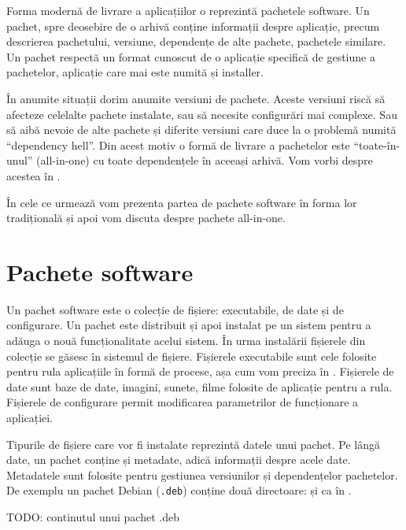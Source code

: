 Forma modernă de livrare a aplicațiilor o reprezintă pachetele software. Un pachet, spre deosebire de o arhivă conține informații despre aplicație, precum descrierea pachetului, versiune, dependențe de alte pachete, pachetele similare. Un pachet respectă un format cunoscut de o aplicație specifică de gestiune a pachetelor, aplicație care mai este numită și installer.

În anumite situații dorim anumite versiuni de pachete. Aceste versiuni riscă să afecteze celelalte pachete instalate, sau să necesite configurări mai complexe. Sau să aibă nevoie de alte pachete și diferite versiuni care duce la o problemă numită “dependency hell”. Din acest motiv o formă de livrare a pachetelor este “toate-în-unul” (all-in-one) cu toate dependențele în aceeași arhivă. Vom vorbi despre acestea în .

În cele ce urmează vom prezenta partea de pachete software în forma lor tradițională și apoi vom discuta despre pachete all-in-one.

\section{Pachete software}
\label{sec:package:overview}

Un pachet software este o colecție de fișiere: executabile, de date și de configurare. Un pachet este distribuit și apoi instalat pe un sistem pentru a adăuga o nouă funcționalitate acelui sistem. În urma instalării fișierele din colecție se găsesc în sistemul de fișiere. Fișierele executabile sunt cele folosite pentru rula aplicațiile în formă de procese, așa cum vom preciza în . Fișierele de date sunt baze de date, imagini, sunete, filme folosite de aplicație pentru a rula. Fișierele de configurare permit modificarea parametrilor de funcționare a aplicației.

Tipurile de fișiere care vor fi instalate reprezintă datele unui pachet. Pe lângă date, un pachet conține și metadate, adică informații despre acele date. Metadatele sunt folosite pentru gestiunea versiunilor și dependențelor pachetelor. De exemplu un pachet Debian (\texttt{.deb}) conține două directoare:  și  ca în .

\begin{screen}[caption={Conținutul unui pachet Debian (.deb)},label={lst:package:deb-contents}]
TODO: continutul unui pachet .deb
\end{screen}

